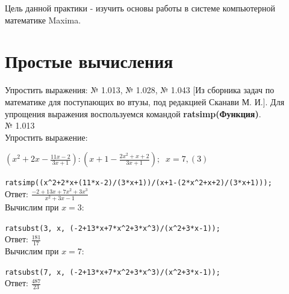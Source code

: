 \documentclass[article, bachelor, och, pract]{SCWorks}
\begin{document}
\worktitle{}





\chname{}  







\MakeTitle

\setcounter{tocdepth}{1}

\tableofcontents
\intro


Цель данной практики - изучить основы работы в системе компьютерной математике Maxima. 


\section{Простые вычисления}
Упростить выражения: № 1.013, № 1.028, № 1.043 [Из сборника задач по математике для поступающих во втузы, под редакцией Сканави М. И.]. Для упрощения выражения воспользуемся командой \textbf{ratsimp(Функция)}.
\\

№ 1.013\\
Упростить выражение:

$(x^2+2x-\frac{11x-2}{3x+1}):(x+1-\frac{2x^2+x+2}{3x+1}); \; \; x=7,(3)$

\texttt{ratsimp((x\^{}2+2*x+(11*x-2)/(3*x+1))/(x+1-(2*x\^{}2+x+2)/(3*x+1)));}\\
Ответ: $\frac{-2+13x+7x^2+3x^3}{x^2+3x-1}$
\\
Вычислим при $x = 3:$

\texttt{ratsubst(3, x, (-2+13*x+7*x\^{}2+3*x\^{}3)/(x\^{}2+3*x-1));}\\
Ответ: $\frac{181}{17}$
\\
Вычислим при $x = 7:$

\texttt{ratsubst(7, x, (-2+13*x+7*x\^{}2+3*x\^{}3)/(x\^{}2+3*x-1));}\\
Ответ: $\frac{487}{23}$
\\
\end{document}

